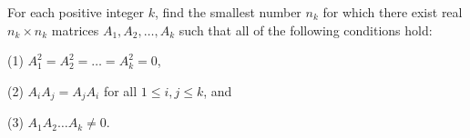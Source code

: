 For each positive integer \( k\), find the smallest number \( n_{k}\) for which there exist real \( n_{k}\times n_{k}\) matrices \( A_{1}, A_{2}, \ldots, A_{k}\) such that all of the following conditions hold:

(1) \( A_{1}^{2}= A_{2}^{2}= \ldots = A_{k}^{2}= 0\),

(2) \( A_{i}A_{j}= A_{j}A_{i}\) for all \( 1 \le i, j \le k\), and

(3) \( A_{1}A_{2}\ldots A_{k}\ne 0\).